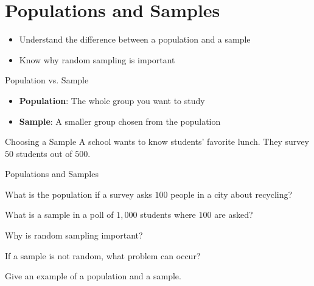 \section{Populations and Samples}

\begin{learningGoals}
\begin{itemize}
    \item Understand the difference between a population and a sample
    \item Know why random sampling is important
\end{itemize}
\end{learningGoals}

\begin{conceptBox}{Population vs. Sample}
\begin{itemize}[leftmargin=*]
    \item \textbf{Population}: The whole group you want to study
    \item \textbf{Sample}: A smaller group chosen from the population
\end{itemize}
\end{conceptBox}

\begin{workedExample}{Choosing a Sample}
A school wants to know students' favorite lunch. They survey $50$ students out of $500$.
\end{workedExample}


\begin{practiceBox}{Populations and Samples}
\resetProblems

\prob What is the population if a survey asks $100$ people in a city about recycling?

\prob What is a sample in a poll of $1,000$ students where $100$ are asked?

\prob Why is random sampling important?

\prob If a sample is not random, what problem can occur?

\prob Give an example of a population and a sample.

\end{practiceBox}
